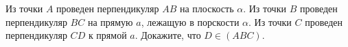 Из точки $A$ проведен перпендикуляр $AB$ на плоскость $\alpha$. Из точки $B$ проведен перпендикуляр $BC$ на прямую $a$, лежащую в порскости $\alpha$. Из точки $C$ проведен перпендикуляр $CD$ к прямой $a$. Докажите, что $D\in (ABC)$.